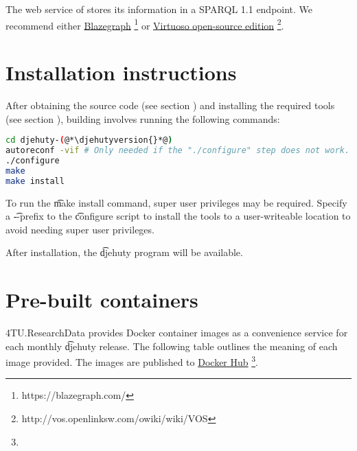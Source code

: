 
  The web service of  stores its information in a SPARQL 1.1
  \citep{sparql-11} endpoint.  We recommend either
  \href{https://blazegraph.com/}{Blazegraph}%
  \footnote{https://blazegraph.com/}
  or \href{http://vos.openlinksw.com/owiki/wiki/VOS}%
  {Virtuoso open-source edition}%
  \footnote{http://vos.openlinksw.com/owiki/wiki/VOS}.

\section{Installation instructions}

  After obtaining the source code (see section )
  and installing the required tools (see section ),
  building involves running the following commands:

\begin{lstlisting}[language=bash]
cd djehuty-(@*\djehutyversion{}*@)
autoreconf -vif # Only needed if the "./configure" step does not work.
./configure
make
make install
\end{lstlisting}

  To run the \t{make install} command, super user privileges may be
  required.  Specify a \t{-{}-prefix} to the \t{configure}
  script to install the tools to a user-writeable location to avoid
  needing super user privileges.

  After installation, the \t{djehuty} program will be available.

\section{Pre-built containers}

  4TU.ResearchData provides Docker container images as a convenience service
  for each monthly \t{djehuty} release.  The following table outlines the
  meaning of each image provided.  The images are published to
  \href{https://hub.docker.com/r/4turesearchdata/djehuty}{Docker Hub}%
  \footnote{}.

